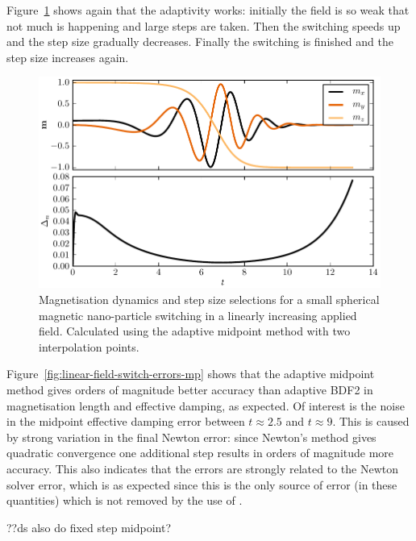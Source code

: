 Figure~\ref{fig:linear-field-switch-mp} shows again that the adaptivity works: initially the field is so weak that not much is happening and large steps are taken.
Then the switching speeds up and the step size gradually decreases.
Finally the switching is finished and the step size increases again.

\begin{figure}[ht!]
  \centering
  \includegraphics{images/linear_field_switch_solution}
  \caption{Magnetisation dynamics and step size selections for a small spherical magnetic nano-particle switching in a linearly increasing applied field. Calculated using the adaptive midpoint method with two interpolation points.}
  \label{fig:linear-field-switch-mp}
\end{figure}

Figure~\ref{fig:linear-field-switch-errors-mp} shows that the adaptive midpoint method gives orders of magnitude better accuracy than adaptive BDF2 in magnetisation length and effective damping, as expected.
Of interest is the noise in the midpoint effective damping error between $t \approx 2.5$ and $t \approx 9$.
This is caused by strong variation in the final Newton error: since Newton's method gives quadratic convergence one additional step results in orders of magnitude more accuracy.
This also indicates that the errors are strongly related to the Newton solver error, which is as expected since this is the only source of error (in these quantities) which is not removed by the use of \imr.

??ds also do fixed step midpoint?


